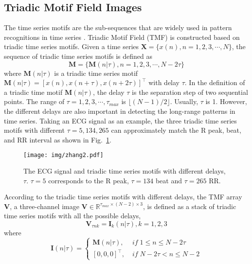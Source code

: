 \documentclass[journal]{IEEEtran}
\begin{document}
\subsection{Triadic Motif Field Images}
The time series motifs are the sub-sequences that are widely used in pattern recognitions in time series \cite{motif_2003,motif_2005,motif_2006}. 
Triadic Motif Field (TMF) is constructed based on triadic time series motifs.
Given a time series $\mathbold{X}=\{x(n), n=1,2,3,\cdots,N\}$, the sequence of triadic time series motifs is defined as 
\begin{equation}
  \mathbold{M}=\{\mathbold{M}(n|\tau), n=1,2,3,\cdots, N-2\tau\}
\end{equation}
where $\mathbold{M}(n|\tau)$ is a triadic time series motif $\mathbold{M}(n|\tau) = [x(n), x(n+\tau), x(n+2\tau)]^\top$ with delay $\tau$.
In the definition of a triadic time motif $\mathbold{M}(n|\tau)$, the delay $\tau$ is the separation step of two sequential points. The range of $\tau=1,2,3,\cdots,\tau_{max}$ is $\lfloor (N-1)/2 \rfloor$. Usually, $\tau$ is 1. However, the different delays are also important in detecting the long-range patterns in time series. Taking an ECG signal as an example, the three triadic time series motifs with different $\tau=5, 134, 265$ can approximately match the R peak, beat, and RR interval as shown in Fig.~\ref{fig:triad}. 

\begin{figure}[H]
\centering
\texttt{[image: img/zhang2.pdf]}
\caption{The ECG signal and triadic time series motifs with different delays, $\tau$. $\tau=5$ corresponds to the R peak, $\tau=134$ beat and $\tau=265$ RR.}
\label{fig:triad}
\end{figure}

According to the triadic time series motifs with different delays, the TMF array $\mathbold{V}$, a three-channel image $\mathbold{V} \in \mathbb{R}^{\tau_{max} \times (N-2) \times 3}$, is defined as a stack of triadic time series motifs with all the possible delays, 
\begin{equation}
  \mathbold{V}_{\tau n k} = \mathbold{I}_k(n|\tau), k=1,2,3
\end{equation}
where
\begin{equation}
  \mathbold{I}(n|\tau) = 
  \begin{cases}
    \mathbold{M}(n|\tau),  &\; if\; 1 \leq n \leq N-2\tau \\
    [0, 0, 0]^\top , &\; if\; N-2\tau <n \leq N-2
  \end{cases}
\end{equation}
\end{document}
